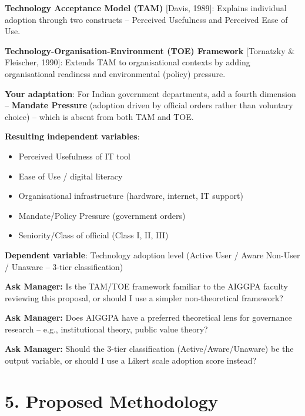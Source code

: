\documentclass[12pt,a4paper]{article}
\newcommand{\managerQ}[1]{%
  \begin{tcolorbox}[colback=govgold!10,colframe=govgold,boxrule=0.5pt,arc=2mm,
    left=4pt,right=4pt,top=2pt,bottom=2pt]
    \small\textbf{Ask Manager:} #1
  \end{tcolorbox}
}
\begin{document}
\begin{tcolorbox}[colback=govgray,colframe=govblue!30,arc=2mm]
\small
\textbf{Technology Acceptance Model (TAM)} [Davis, 1989]: Explains individual adoption through two constructs -- Perceived Usefulness and Perceived Ease of Use.

\textbf{Technology-Organisation-Environment (TOE) Framework} [Tornatzky \& Fleischer, 1990]: Extends TAM to organisational contexts by adding organisational readiness and environmental (policy) pressure.

\textbf{Your adaptation}: For Indian government departments, add a fourth dimension -- \textbf{Mandate Pressure} (adoption driven by official orders rather than voluntary choice) -- which is absent from both TAM and TOE.

\textbf{Resulting independent variables}:
\begin{itemize}[leftmargin=1.5em,itemsep=0pt]
  \item Perceived Usefulness of IT tool
  \item Ease of Use / digital literacy
  \item Organisational infrastructure (hardware, internet, IT support)
  \item Mandate/Policy Pressure (government orders)
  \item Seniority/Class of official (Class I, II, III)
\end{itemize}
\textbf{Dependent variable}: Technology adoption level (Active User / Aware Non-User / Unaware -- 3-tier classification)
\end{tcolorbox}

\managerQ{Is the TAM/TOE framework familiar to the AIGGPA faculty reviewing this proposal, or should I use a simpler non-theoretical framework?}

\managerQ{Does AIGGPA have a preferred theoretical lens for governance research -- e.g., institutional theory, public value theory?}

\managerQ{Should the 3-tier classification (Active/Aware/Unaware) be the output variable, or should I use a Likert scale adoption score instead?}

\vspace{0.4cm}

\section{5. Proposed Methodology}
\end{document}
